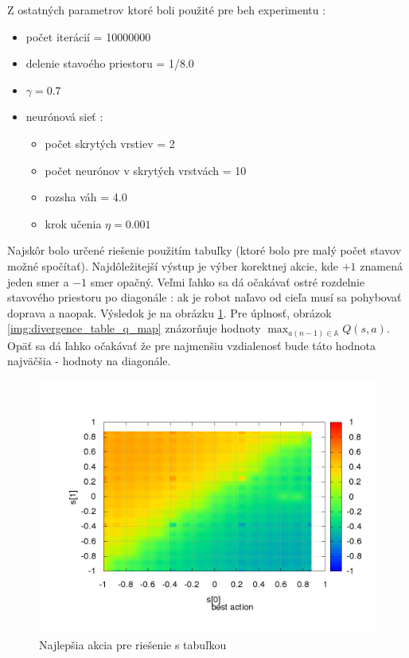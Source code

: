 Z ostatných parametrov ktoré boli použité pre beh experimentu :

\begin{itemize}
\item počet iterácií = 10000000
\item delenie stavoého priestoru = 1/8.0
\item $\gamma = 0.7$
\item neurónová sieť :
  \begin{itemize}
  \item počet skrytých vrstiev = 2
  \item počet neurónov v skrytých vrstvách = 10
  \item rozsha váh = 4.0
  \item krok učenia $\eta = 0.001$
  \end{itemize}
\end{itemize}

Najskôr bolo určené riešenie použitím tabuľky (ktoré bolo pre malý počet stavov možné spočítať).
Najdôležitejší výstup je výber korektnej akcie, kde $+1$ znamená jeden smer a $-1$ smer opačný.
Veľmi ľahko sa dá očakávať ostré rozdelnie stavového priestoru po diagonále :
ak je robot naľavo od cieľa musí sa pohybovať doprava a naopak. Výsledok je na obrázku
\ref{img:divergence_table_action}. Pre úplnosť, obrázok \ref{img:divergence_table_q_map}
znázorňuje hodnoty $\max_{a(n-1) \in \mathbb{A}} Q(s, a)$. Opäť sa dá ľahko očakávať
že pre najmenšiu vzdialenosť bude táto hodnota najväčšia - hodnoty na diagonále.


\begin{figure}[!htb]
\centering
\includegraphics[scale=.4]{../../results_q_learning/experiment_divergence/table/q_action.png}
\caption{Najlepšia akcia pre riešenie s tabuľkou}
\label{img:divergence_table_action}
\end{figure}


